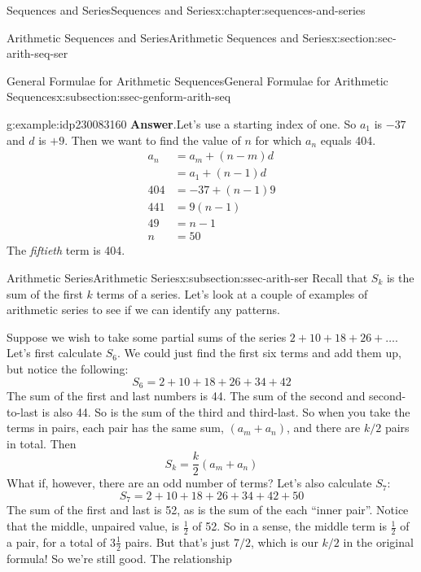 \documentclass[twoside,10pt,]{book}
\newcommand{\blocktitlefont}{\relax}
\numberwithin{equation}{section}
\newcommand{\amp}{&}
\begin{document}
\begin{chapterptx}{Sequences and Series}{}{Sequences and Series}{}{}{x:chapter:sequences-and-series}
\begin{sectionptx}{Arithmetic Sequences and Series}{}{Arithmetic Sequences and Series}{}{}{x:section:sec-arith-seq-ser}
\begin{subsectionptx}{General Formulae for Arithmetic Sequences}{}{General Formulae for Arithmetic Sequences}{}{}{x:subsection:ssec-genform-arith-seq}
\begin{example}{}{g:example:idp230083160}
\noindent\textbf{\blocktitlefont Answer}.\label{g:answer:idp230083800}{}\hypertarget{g:answer:idp230083800}{}\quad{}Let's use a starting index of one.  So \(a_1\) is \(-37\) and \(d\) is \(+9\).  Then we want to find the value of \(n\) for which \(a_n\) equals 404.%
\begin{align*}
a_n \amp = a_m + \left( n - m \right)d\\
\amp = a_1 + \left(n - 1 \right)d\\
404 \amp =  - 37 + \left( n - 1 \right)9\\
441 \amp = 9\left( n - 1 \right)\\
49 \amp = n - 1\\
n \amp = 50
\end{align*}
The \emph{fiftieth} term is 404.\end{example}
%
\end{subsectionptx}
%
%
\typeout{************************************************}
\typeout{************************************************}
%
\begin{subsectionptx}{Arithmetic Series}{}{Arithmetic Series}{}{}{x:subsection:ssec-arith-ser}
Recall that \(S_k\) is the sum of the first \(k\) terms of a series.  Let's look at a couple of examples of arithmetic series to see if we can identify any patterns.%
\par
Suppose we wish to take some partial sums of the series \(2 + 10 + 18 + 26 + \ldots\).  Let's first calculate \(S_6\).  We could just find the first six terms and add them up, but notice the following:%
\begin{equation*}
S_6 = 2 + 10 + 18 + 26 + 34 + 42
\end{equation*}
The sum of the first and last numbers is 44.  The sum of the second and second-to-last is also 44.  So is the sum of the third and third-last.  So when you take the terms in pairs, each pair has the same sum, \((a_m + a_n)\), and there are \(k/2\) pairs in total.  Then%
\begin{equation*}
S_k = \frac{k}{2}\left( a_m + a_n \right)
\end{equation*}
What if, however, there are an odd number of terms?  Let's also calculate \(S_7\):%
\begin{equation*}
S_7 = 2 + 10 + 18 + 26 + 34 + 42 + 50
\end{equation*}
The sum of the first and last is 52, as is the sum of the each ``inner pair''.  Notice that the middle, unpaired value, is \(\frac{1}{2}\) of 52.  So in a sense, the middle term is \(\frac{1}{2}\)  of a pair, for a total of \(3\frac{1}{2}\)  pairs.  But that's just \(7/2\), which is our \(k/2\) in the original formula!  So we're still good.  The relationship%

\end{subsectionptx}
\end{sectionptx}
\end{chapterptx}
\end{document}
